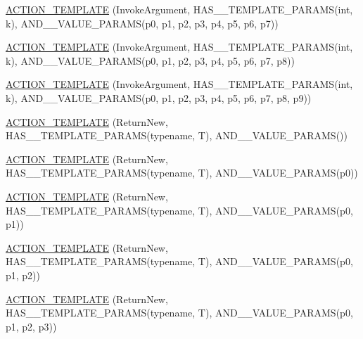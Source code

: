 \begin{DoxyCompactItemize}
\hyperlink{namespacetesting_a8725892aafb62cc8f6f76280d29595d8}{A\+C\+T\+I\+O\+N\+\_\+\+T\+E\+M\+P\+L\+A\+TE} (Invoke\+Argument, H\+A\+S\+\_\+\_\+\+T\+E\+M\+P\+L\+A\+T\+E\+\_\+\+P\+A\+R\+A\+MS(int, k), A\+N\+D\+\_\+\_\+\+V\+A\+L\+U\+E\+\_\+\+P\+A\+R\+A\+MS(p0, p1, p2, p3, p4, p5, p6, p7))
\item 
\hyperlink{namespacetesting_a910551adbfeb1854071ef55ae54a5c0f}{A\+C\+T\+I\+O\+N\+\_\+\+T\+E\+M\+P\+L\+A\+TE} (Invoke\+Argument, H\+A\+S\+\_\+\_\+\+T\+E\+M\+P\+L\+A\+T\+E\+\_\+\+P\+A\+R\+A\+MS(int, k), A\+N\+D\+\_\+\_\+\+V\+A\+L\+U\+E\+\_\+\+P\+A\+R\+A\+MS(p0, p1, p2, p3, p4, p5, p6, p7, p8))
\item 
\hyperlink{namespacetesting_ab7bf885ff274cbdc09f19c39e43b7f2b}{A\+C\+T\+I\+O\+N\+\_\+\+T\+E\+M\+P\+L\+A\+TE} (Invoke\+Argument, H\+A\+S\+\_\+\_\+\+T\+E\+M\+P\+L\+A\+T\+E\+\_\+\+P\+A\+R\+A\+MS(int, k), A\+N\+D\+\_\+\_\+\+V\+A\+L\+U\+E\+\_\+\+P\+A\+R\+A\+MS(p0, p1, p2, p3, p4, p5, p6, p7, p8, p9))
\item 
\hyperlink{namespacetesting_a468e601467d018ab7566f321d3f7e871}{A\+C\+T\+I\+O\+N\+\_\+\+T\+E\+M\+P\+L\+A\+TE} (Return\+New, H\+A\+S\+\_\+\_\+\+T\+E\+M\+P\+L\+A\+T\+E\+\_\+\+P\+A\+R\+A\+MS(typename, T), A\+N\+D\+\_\+\_\+\+V\+A\+L\+U\+E\+\_\+\+P\+A\+R\+A\+MS())
\item 
\hyperlink{namespacetesting_af07e911d69b8efb03bddbd0332f79ba0}{A\+C\+T\+I\+O\+N\+\_\+\+T\+E\+M\+P\+L\+A\+TE} (Return\+New, H\+A\+S\+\_\+\_\+\+T\+E\+M\+P\+L\+A\+T\+E\+\_\+\+P\+A\+R\+A\+MS(typename, T), A\+N\+D\+\_\+\_\+\+V\+A\+L\+U\+E\+\_\+\+P\+A\+R\+A\+MS(p0))
\item 
\hyperlink{namespacetesting_ad418620ed637e789f91d029f4fe85b4b}{A\+C\+T\+I\+O\+N\+\_\+\+T\+E\+M\+P\+L\+A\+TE} (Return\+New, H\+A\+S\+\_\+\_\+\+T\+E\+M\+P\+L\+A\+T\+E\+\_\+\+P\+A\+R\+A\+MS(typename, T), A\+N\+D\+\_\+\_\+\+V\+A\+L\+U\+E\+\_\+\+P\+A\+R\+A\+MS(p0, p1))
\item 
\hyperlink{namespacetesting_ac24511eb64ebe2c2927feaf285ac3785}{A\+C\+T\+I\+O\+N\+\_\+\+T\+E\+M\+P\+L\+A\+TE} (Return\+New, H\+A\+S\+\_\+\_\+\+T\+E\+M\+P\+L\+A\+T\+E\+\_\+\+P\+A\+R\+A\+MS(typename, T), A\+N\+D\+\_\+\_\+\+V\+A\+L\+U\+E\+\_\+\+P\+A\+R\+A\+MS(p0, p1, p2))
\item 
\hyperlink{namespacetesting_afc5a3710d11bdee2023d8402b84d86ed}{A\+C\+T\+I\+O\+N\+\_\+\+T\+E\+M\+P\+L\+A\+TE} (Return\+New, H\+A\+S\+\_\+\_\+\+T\+E\+M\+P\+L\+A\+T\+E\+\_\+\+P\+A\+R\+A\+MS(typename, T), A\+N\+D\+\_\+\_\+\+V\+A\+L\+U\+E\+\_\+\+P\+A\+R\+A\+MS(p0, p1, p2, p3))
\item 

\end{DoxyCompactItemize}
